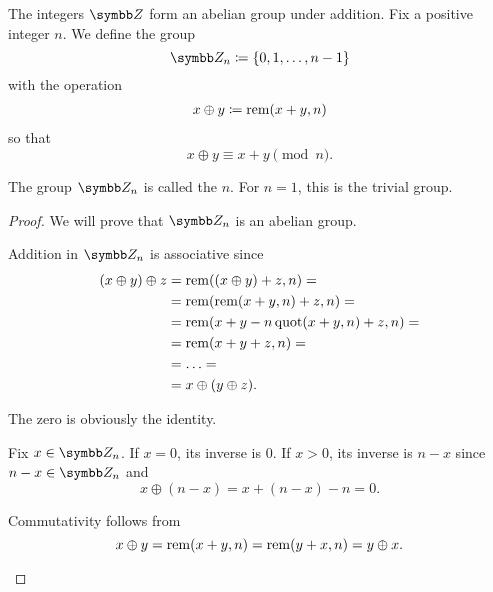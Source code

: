 \begin{definition}\label{def:group_of_integers_modulo}
  The integers \( \Z \) form an abelian group under addition. Fix a positive integer \( n \). We define the group
  \begin{equation*}
    \Z_n \coloneqq \{ 0, 1, \ldots, n - 1 \}
  \end{equation*}
  with the operation
  \begin{align*}
    x \oplus y \coloneqq \operatorname{rem}(x + y, n)
  \end{align*}
  so that
  \begin{equation*}
    x \oplus y \equiv x + y \pmod n.
  \end{equation*}

  The group \( \Z_n \) is called the  \( n \). For \( n = 1 \), this is the trivial group.
\end{definition}
\begin{proof}
  We will prove that \( \Z_n \) is an abelian group.

  \begin{description}
     Addition in \( \Z_n \) is associative since
    \begin{align*}
      (x \oplus y) \oplus z
      &=
      \operatorname{rem}((x \oplus y) + z, n)
      = \\ &=
      \operatorname{rem}(\operatorname{rem}(x + y, n) + z, n)
      = \\ &=
      \operatorname{rem}(x + y - n \operatorname{quot}(x + y, n) + z, n)
      = \\ &=
      \operatorname{rem}(x + y + z, n)
      = \\ &=
      \ldots
      = \\ &=
      x \oplus (y \oplus z).
    \end{align*}

     The zero is obviously the identity.

     Fix \( x \in \Z_n \). If \( x = 0 \), its inverse is \( 0 \). If \( x > 0 \), its inverse is \( n - x \) since \( n - x \in \Z_n \) and
    \begin{equation*}
      x \oplus (n - x) = x + (n - x) - n = 0.
    \end{equation*}

     Commutativity follows from
    \begin{equation*}
      x \oplus y
      =
      \operatorname{rem}(x + y, n)
      =
      \operatorname{rem}(y + x, n)
      =
      y \oplus x.
    \end{equation*}
  \end{description}
\end{proof}

